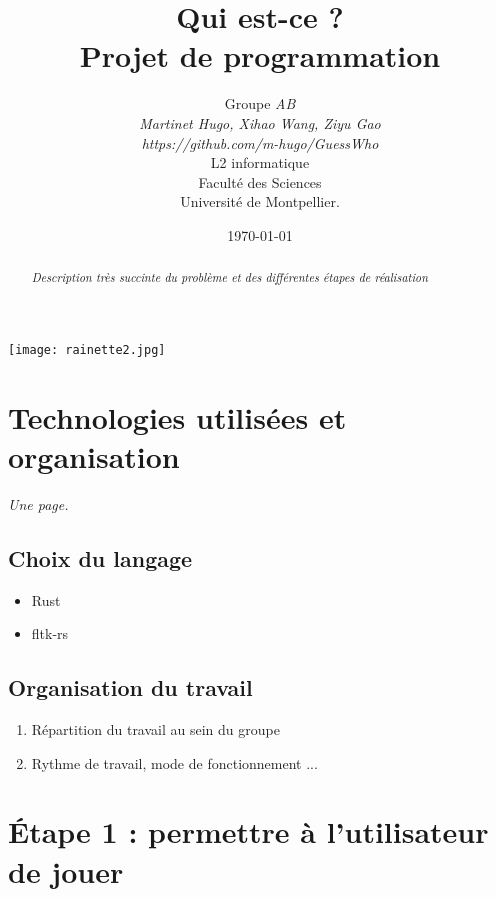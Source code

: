 \documentclass[a4paper]{article}
\title{  Qui est-ce ?\\         %
  Projet de programmation}
\author{Groupe \emph{AB}\\
  \emph{Martinet Hugo, Xihao Wang, Ziyu Gao}\\
  \emph{https://github.com/m-hugo/GuessWho}\\
  L2 informatique\\
  Faculté des Sciences\\
Université de Montpellier.}
\date{\today}
\begin{document}
\maketitle                    %

\begin{center}               %
  \texttt{[image: rainette2.jpg]}   %
\end{center}

\begin{abstract}     %

  \emph{Description très succinte du problème et des différentes étapes de réalisation}

\end{abstract}


\section{ Technologies utilisées  et organisation} %

\emph{Une page.}

\subsection{Choix du langage}         %

\begin{itemize}            %
\item
  Rust
\item
  fltk-rs
\end{itemize}

\subsection{Organisation du travail}

\begin{enumerate}           %
\item
  Répartition du travail au sein du groupe
\item
  Rythme de travail, mode de fonctionnement ...
\end{enumerate}
\section{Étape 1 : permettre à l'utilisateur de jouer}
\end{document}
